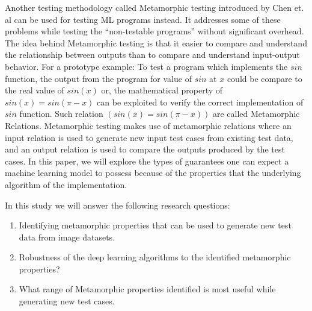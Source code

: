 Another testing methodology called Metamorphic testing introduced by Chen et. al can be used for testing ML programs instead. It addresses some of these problems while testing the \enquote{non-testable programs} without significant overhead. The idea behind Metamorphic testing is that it easier to compare and understand the relationship between outputs than to compare and understand input-output behavior. For a prototype example: To test a program which implements the $sin$ function, the output from the program for value of $sin$ at $x$ could be compare to the real value of $sin(x)$ or, the mathematical property of $sin(x) = sin(\pi-x)$ can be exploited to verify the correct implementation of $sin$ function. Such relation $(sin(x) = sin(\pi-x))$ are called Metamorphic Relations. Metamorphic testing makes use of metamorphic relations where an input relation is used to generate new input test cases from existing test data, and an output relation is used to compare the outputs produced by the test cases.\newline
In this paper, we will explore the types of guarantees one can expect a machine learning model to possess because of the properties that the underlying algorithm of the implementation.


In this study we will answer the following research questions:
\begin{enumerate}
  \item Identifying metamorphic properties that can be used to generate new test data from image datasets.
  \item Robustness of the deep learning algorithms to the identified metamorphic properties?
  \item What range of Metamorphic properties identified is most useful while generating new test cases.
  
\end{enumerate}
%
